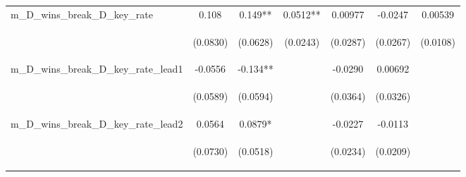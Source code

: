 \documentclass[]{article}
\begin{document}
\begin{center}
\begin{tabular}{lcccccc}
m\_D\_wins\_break\_D\_key\_rate & 0.108 & 0.149** & 0.0512** & 0.00977 & -0.0247 & 0.00539 \\
\vspace{4pt} & \begin{footnotesize}(0.0830)\end{footnotesize} & \begin{footnotesize}(0.0628)\end{footnotesize} & \begin{footnotesize}(0.0243)\end{footnotesize} & \begin{footnotesize}(0.0287)\end{footnotesize} & \begin{footnotesize}(0.0267)\end{footnotesize} & \begin{footnotesize}(0.0108)\end{footnotesize} \\
m\_D\_wins\_break\_D\_key\_rate\_lead1 & -0.0556 & -0.134** &  & -0.0290 & 0.00692 &  \\
\vspace{4pt} & \begin{footnotesize}(0.0589)\end{footnotesize} & \begin{footnotesize}(0.0594)\end{footnotesize} & \begin{footnotesize}\end{footnotesize} & \begin{footnotesize}(0.0364)\end{footnotesize} & \begin{footnotesize}(0.0326)\end{footnotesize} & \begin{footnotesize}\end{footnotesize} \\
m\_D\_wins\_break\_D\_key\_rate\_lead2 & 0.0564 & 0.0879* &  & -0.0227 & -0.0113 &  \\
\vspace{4pt} & \begin{footnotesize}(0.0730)\end{footnotesize} & \begin{footnotesize}(0.0518)\end{footnotesize} & \begin{footnotesize}\end{footnotesize} & \begin{footnotesize}(0.0234)\end{footnotesize} & \begin{footnotesize}(0.0209)\end{footnotesize} & \begin{footnotesize}\end{footnotesize} \\

\end{tabular}
\end{center}
\end{document}
